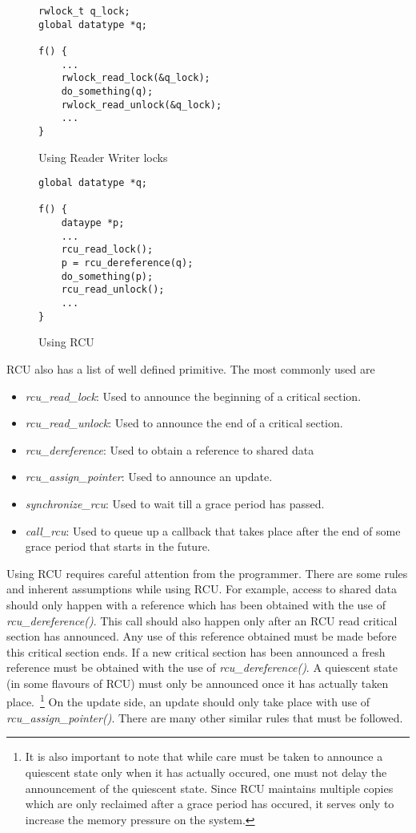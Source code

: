 \begin{figure}[t]
\centering
\begin{lstlisting}
rwlock_t q_lock;
global datatype *q;

f() {
	...
	rwlock_read_lock(&q_lock);
	do_something(q);
	rwlock_read_unlock(&q_lock);
	...
}
\end{lstlisting}
\caption{Using Reader Writer locks}\label{fig:rwuse}
\end{figure}

\begin{figure}[b]
\centering
\begin{lstlisting}
global datatype *q;

f() {
	dataype *p;
	...
	rcu_read_lock();
	p = rcu_dereference(q);
	do_something(p);
	rcu_read_unlock();
	...
}
\end{lstlisting}
\caption{Using RCU}\label{fig:RCUuse}
\end{figure}


RCU also has a list of well defined primitive. The most commonly used are
\begin{itemize}
\item\emph{rcu\_read\_lock}: Used to announce the beginning of a critical section.
\item\emph{rcu\_read\_unlock}: Used to announce the end of a critical section.
\item\emph{rcu\_dereference}: Used to obtain a reference to shared data
\item\emph{rcu\_assign\_pointer}: Used to announce an update.
\item\emph{synchronize\_rcu}: Used to wait till a grace period has passed.
\item\emph{call\_rcu}: Used to queue up a callback that takes place after the end of some grace period that starts in the future.
\end{itemize}


Using RCU requires careful attention from the programmer. There are some rules
and inherent assumptions while using RCU. For example, access to shared data
should only happen with a reference which has been obtained with the use of
\emph{rcu\_dereference()}. This call should also happen only after an RCU read critical
section has announced. Any use of this reference obtained must be made before
this critical section ends. If a new critical section has been announced a
fresh reference must be obtained with the use of \emph{rcu\_dereference()}. A quiescent
state (in some flavours of RCU) must only be announced once it has actually
taken place.~\footnote{It is also important to note that while care must be taken to announce a
quiescent state only when it has actually occured, one must not delay the announcement
of the quiescent state. Since RCU maintains multiple copies which are only reclaimed
after a grace period has occured, it serves only to increase the memory pressure on
the system.} On the update side, an update should only take place with use
of \emph{rcu\_assign\_pointer()}. There are many other similar rules that must be
followed.
